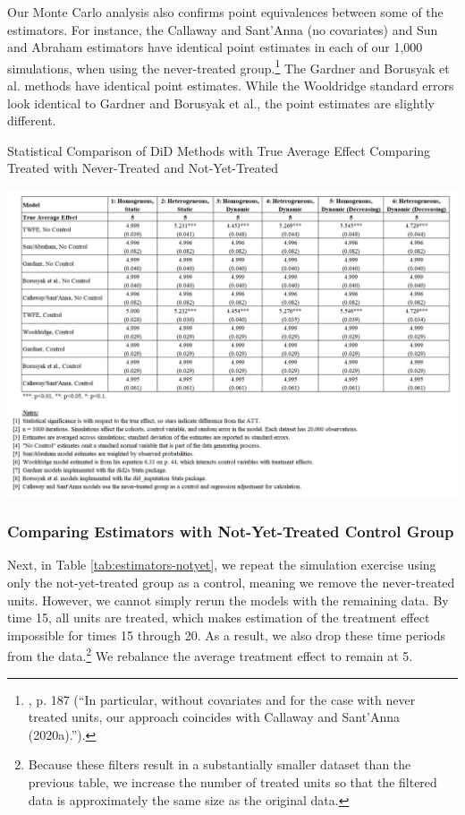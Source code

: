 \documentclass[12pt]{article}
\begin{document}
Our Monte Carlo analysis also confirms point equivalences between some of the estimators. For instance, the Callaway and Sant’Anna (no covariates) and Sun and Abraham estimators have identical point estimates in each of our 1,000 simulations, when using the never-treated group.\footnote{\citet{sunabr2021a}, p. 187 (“In particular, without covariates and for the case with never treated units, our approach coincides with Callaway and Sant’Anna (2020a).”).}  The Gardner and Borusyak et al. methods have identical point estimates. While the Wooldridge standard errors look identical to Gardner and Borusyak et al., the point estimates are slightly different.
\begin{table}[H]
    \centering
    \caption{Statistical Comparison of DiD Methods with True Average Effect
Comparing Treated with Never-Treated and Not-Yet-Treated}
    \includegraphics[width=6in]{Figures/Table 1.png}
    \label{tab:estimators-never}
\end{table}

\subsubsection{Comparing Estimators with Not-Yet-Treated Control Group}
Next, in Table \ref{tab:estimators-notyet}, we repeat the simulation exercise using only the not-yet-treated group as a control, meaning we remove the never-treated units. However, we cannot simply rerun the models with the remaining data. By time 15, all units are treated, which makes estimation of the treatment effect impossible for times 15 through 20. As a result, we also drop these time periods from the data.\footnote{Because these filters result in a substantially smaller dataset than the previous table, we increase the number of treated units so that the filtered data is approximately the same size as the original data.}  We rebalance the average treatment effect to remain at 5. 
\end{document}
